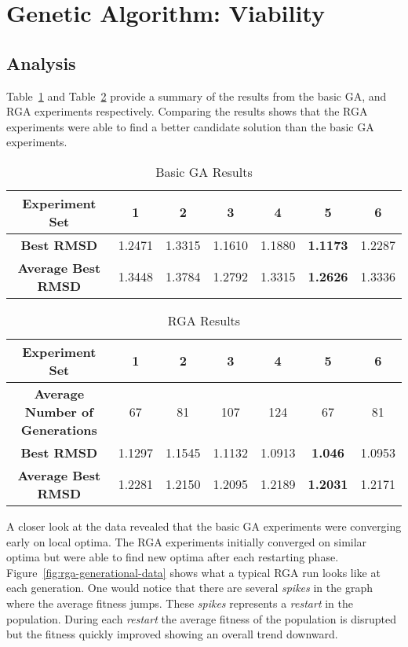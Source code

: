 \section{Genetic Algorithm: Viability}

\subsection{Analysis}

Table~\ref{table:basic-ga-results} and Table~\ref{table:rga-results} provide a summary of the results from the basic GA, and RGA experiments respectively. Comparing the results shows that the RGA experiments were able to find a better candidate solution than the basic GA experiments. 

\begin{table}
	\centering
	\begin{tabular}{ | >{\bfseries}c | c | c | c | c | c | c | }
		\hline
		Experiment Set & 1 & 2 & 3 & 4 & 5 & 6 \\ \hline
		Best RMSD & 1.2471 & 1.3315 & 1.1610 & 1.1880 & \textbf{1.1173} & 1.2287 \\ \hline
		Average Best RMSD & 1.3448 & 1.3784 & 1.2792 & 1.3315 & \textbf{1.2626} & 1.3336 \\ \hline
	\end{tabular}
	\caption{Basic GA Results}
	\label{table:basic-ga-results}
\end{table}

\begin{table}
	\centering
	\begin{tabular}{ | >{\bfseries}c | c | c | c | c | c | c | }
		\hline
		Experiment Set & 1 & 2 & 3 & 4 & 5 & 6 \\ \hline
		Average Number of Generations & 67 & 81 & 107 & 124 & 67 & 81 \\ \hline
		Best RMSD & 1.1297 & 1.1545 & 1.1132 & 1.0913 & \textbf{1.046} & 1.0953 \\ \hline
		Average Best RMSD & 1.2281 & 1.2150 & 1.2095 & 1.2189 & \textbf{1.2031} & 1.2171 \\ \hline
	\end{tabular}
	\caption{RGA Results}
	\label{table:rga-results}
\end{table}

A closer look at the data revealed that the basic GA experiments were converging early on local optima. The RGA experiments initially converged on similar optima but were able to find new optima after each restarting phase. Figure~\ref{fig:rga-generational-data} shows what a typical RGA run looks like at each generation. One would notice that there are several \textit{spikes} in the graph where the average fitness jumps. These \textit{spikes} represents a \textit{restart} in the population. During each \textit{restart} the average fitness of the population is disrupted but the fitness quickly improved showing an overall trend downward.


